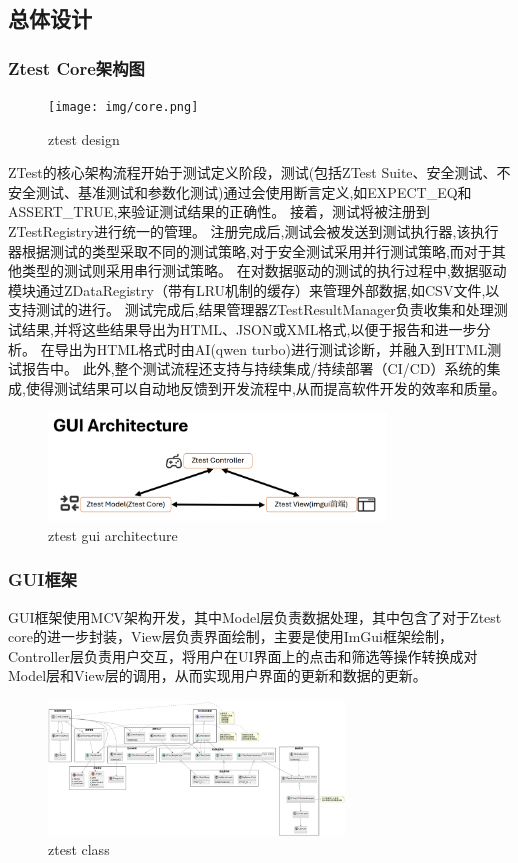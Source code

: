 \documentclass{article}
\begin{document}
\subsection{总体设计}
\subsubsection{Ztest Core架构图}
\begin{figure}[H]
    \centering
    \texttt{[image: img/core.png]} %
    \caption{ ztest design}
    \label{fig:ztest design }
\end{figure}
ZTest的核心架构流程开始于测试定义阶段，测试(包括ZTest Suite、安全测试、不安全测试、基准测试和参数化测试)通过会使用断言定义,如EXPECT\_EQ和ASSERT\_TRUE,来验证测试结果的正确性。
接着，测试将被注册到ZTestRegistry进行统一的管理。
注册完成后,测试会被发送到测试执行器,该执行器根据测试的类型采取不同的测试策略,对于安全测试采用并行测试策略,而对于其他类型的测试则采用串行测试策略。
在对数据驱动的测试的执行过程中,数据驱动模块通过ZDataRegistry（带有LRU机制的缓存）来管理外部数据,如CSV文件,以支持测试的进行。
测试完成后,结果管理器ZTestResultManager负责收集和处理测试结果,并将这些结果导出为HTML、JSON或XML格式,以便于报告和进一步分析。
在导出为HTML格式时由AI(qwen turbo)进行测试诊断，并融入到HTML测试报告中。
此外,整个测试流程还支持与持续集成/持续部署（CI/CD）系统的集成,使得测试结果可以自动地反馈到开发流程中,从而提高软件开发的效率和质量。
\begin{figure}[H]
    \centering
    \includegraphics[width=0.8\textwidth]{img/guiarch.png} %
    \caption{ ztest gui architecture}
    \label{fig:ztest gui architecture }
\end{figure}
\subsubsection{GUI框架}
GUI框架使用MCV架构开发，其中Model层负责数据处理，其中包含了对于Ztest core的进一步封装，View层负责界面绘制，主要是使用ImGui框架绘制，Controller层负责用户交互，将用户在UI界面上的点击和筛选等操作转换成对Model层和View层的调用，从而实现用户界面的更新和数据的更新。
\newpage
\begin{figure}[H]
    \centering
    \includegraphics[angle=270,width=0.7\textwidth]{img/class.png} %
    \caption{ ztest class}
    \label{fig:ztest class }
\end{figure}
\end{document}
